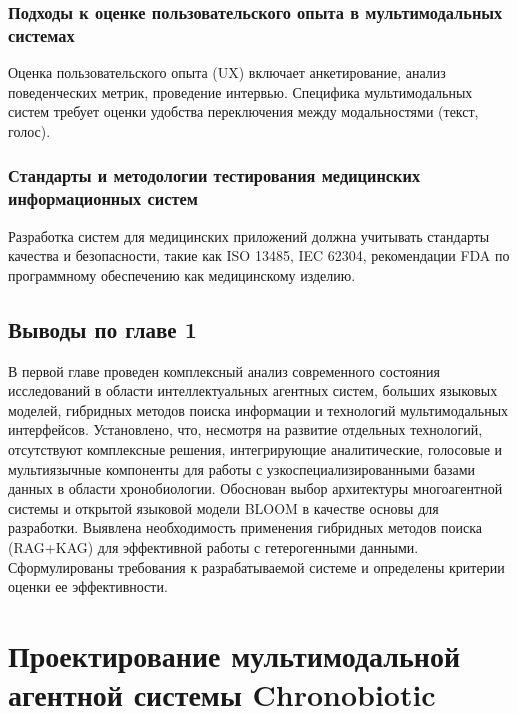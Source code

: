 \documentclass[a4paper,14pt]{extarticle}
\begin{document}
	\subsubsection{Подходы к оценке пользовательского опыта в мультимодальных системах}
	Оценка пользовательского опыта (UX) включает анкетирование, анализ поведенческих метрик, проведение интервью. Специфика мультимодальных систем требует оценки удобства переключения между модальностями (текст, голос).
	
	\subsubsection{Стандарты и методологии тестирования медицинских информационных систем}
	Разработка систем для медицинских приложений должна учитывать стандарты качества и безопасности, такие как ISO 13485, IEC 62304, рекомендации FDA по программному обеспечению как медицинскому изделию.
	
	\subsection*{Выводы по главе 1}
	
	В первой главе проведен комплексный анализ современного состояния исследований в области интеллектуальных агентных систем, больших языковых моделей, гибридных методов поиска информации и технологий мультимодальных интерфейсов. Установлено, что, несмотря на развитие отдельных технологий, отсутствуют комплексные решения, интегрирующие аналитические, голосовые и мультиязычные компоненты для работы с узкоспециализированными базами данных в области хронобиологии. Обоснован выбор архитектуры многоагентной системы и открытой языковой модели BLOOM в качестве основы для разработки. Выявлена необходимость применения гибридных методов поиска (RAG+KAG) для эффективной работы с гетерогенными данными. Сформулированы требования к разрабатываемой системе и определены критерии оценки ее эффективности.
	
	\newpage
	
	\section{Проектирование мультимодальной агентной системы Chronobiotic}
	
\end{document}
